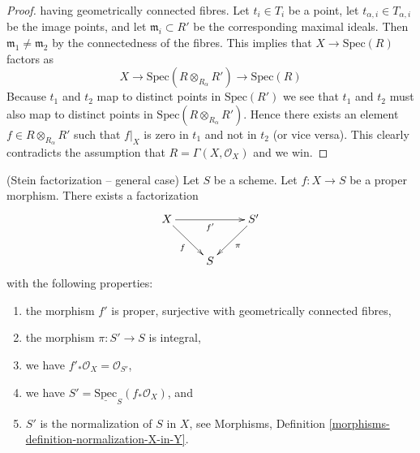 \begin{proof}
having geometrically connected fibres. Let $t_i \in T_i$
be a point, let $t_{\alpha, i} \in T_{\alpha, i}$ be the image points,
and let $\mathfrak m_i \subset R'$ be the corresponding maximal
ideals. Then $\mathfrak m_1 \not = \mathfrak m_2$ by the connectedness
of the fibres. This implies that $X \to \text{Spec}(R)$ factors as
$$
X \longrightarrow
\text{Spec}(R \otimes_{R_\alpha} R') \longrightarrow
\text{Spec}(R)
$$
Because $t_1$ and $t_2$ map to distinct points in $\text{Spec}(R')$
we see that $t_1$ and $t_2$ must also map to distinct points in
$\text{Spec}(R \otimes_{R_\alpha} R')$. Hence there exists an
element $f \in R \otimes_{R_\alpha} R'$ such that
$f|_X$ is zero in $t_1$ and not in $t_2$ (or vice versa).
This clearly contradicts
the assumption that $R = \Gamma(X, \mathcal{O}_X)$ and we win.
\end{proof}

\begin{theorem}
\label{theorem-stein-factorization-general}
(Stein factorization -- general case)
Let $S$ be a scheme.
Let $f : X \to S$ be a proper morphism.
There exists a factorization
$$
\xymatrix{
X \ar[rr]_{f'} \ar[rd]_f & & S' \ar[dl]^\pi \\
& S &
}
$$
with the following properties:
\begin{enumerate}
\item the morphism $f'$ is proper, surjective
with geometrically connected fibres,
\item the morphism $\pi : S' \to S$ is integral,
\item we have $f'_*\mathcal{O}_X = \mathcal{O}_{S'}$,
\item we have $S' = \underline{\text{Spec}}_S(f_*\mathcal{O}_X)$, and
\item $S'$ is the normalization of $S$ in $X$, see
Morphisms, Definition \ref{morphisms-definition-normalization-X-in-Y}.
\end{enumerate}
\end{theorem}

